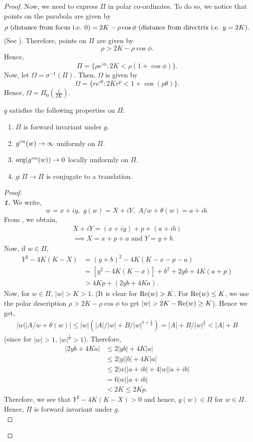 \begin{proof}
	Now, we need to express \( \Pi  \) in polar co-ordinates. To do so, we notice that points on the parabola are given by \[
		\rho \text{ (distance from focus i.e. \( 0 \))}= 2K-\rho \cos \phi \text{ (distance from directrix i.e. \( y=2K \))}
	.\] (See ).
	Therefore, points on \( \Pi \) are given by \[
		\rho > 2K-\rho \cos \phi 
	.\] 
	Hence, \[
		\Pi=\{\rho e^{i\phi }:2K<\rho (1+\cos \phi )\}
	.\] Now, let \( \Omega=\sigma^{-1}(\Pi) \).
	Then, \( \Omega \) is given by \[
		\Omega=\{re^{i \theta }:2Kr^p<1+\cos (p\theta )\}
.\] Hence, \( \Omega=\Pi_0\left(\frac{1}{2K}\right) \).

\begin{lemma}
	\( g \) satisfies the following properties on \( \Pi \):
	\begin{enumerate}
		\item \(\Pi\) is forward invariant under \( g \).
		\item \( \gog[n](w)\to \infty \) uniformly on \( \Pi \).
		\item \( \arg(\gog[n](w))\to 0 \) locally uniformly on \( \Pi \).
		\item \( g:\Pi\to \Pi \) is conjugate to a translation.
	\end{enumerate}
\end{lemma}
\begin{proof}\text{}\\
	\noindent \textbf{\emph{1.}} We write, \[
		w=x+iy,\,\, g(w)=X+iY,\,\, A /w+\theta(w)=a+ib
	.\] 
	From , we obtain,
	\begin{align*}
		X+iY=(x+iy)+p+(a+ib)\\
	\implies X=x+p+a\text{ and }Y=y+b
	.\end{align*}
	Now, if \( w\in \Pi  \),
	\begin{align*}
		Y^2-4K(K-X)&=(y+b)^2-4K(K-x-p-a)\\
				   &=[y^2-4K(K-x)]+b^2+2yb+4K(a+p)\\
				   &> 4Kp+(2yb+4Ka)
	.\end{align*}
	Now, for \( w\in\Pi \), \( |w|>K>1 \). (It is clear for \( \text{Re}(w)>K \). For \( \text{Re}(w)\le K \), we use the polar description \( \rho>2K-\rho \cos \phi  \) to get \( |w|>2K-\re(w)\ge K \)). Hence we get,
	\begin{align}
		|w||A /w+\theta (w)|\le |w| (|A| /|w|+ B /|w|^{1+\frac{1}{p}})=|A|+B /|w|^{\frac{1}{p}}<|A|+B \label{eqn3.3}
	\end{align}
	(since for \( |w|>1 \), \( |w|^{\frac{1}{p}}>1 \)).  Therefore,
	\begin{align*}
		|2yb+4Ka|&\le 2|yb|	+4K|a|\\
				 &\le 2|y| |b|+4 K |a| \\
				 &\le 2|w| |a+ib| +4 |w| |a+ib| \\
				 &=6|w| |a+ib|\\
				 &<2K\le 2Kp
	.\end{align*}
	Therefore, we see that \( Y^2-4K(K-X)>0 \) and hence, \( g(w)\in \Pi \) for \( w\in \Pi \).
	Hence, \( \Pi \) is forward invariant under \( g \).\\
	\vspace{1pt}


\end{proof}
\end{proof}
